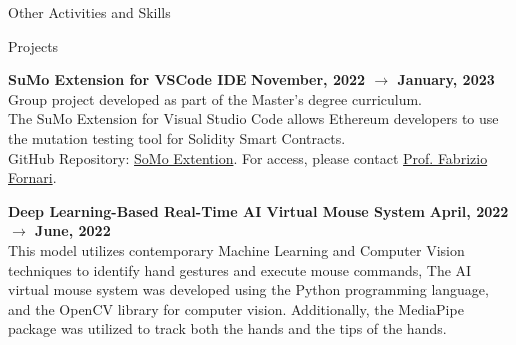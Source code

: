 \documentclass{resume} %
\begin{document}

    \begin{rSection}{Other Activities and Skills}


        \begin{rSubsection2}{ Projects }

            \item\textbf{ SuMo Extension for VSCode IDE }\hfill \textbf{November, 2022 $\rightarrow$ January, 2023}
            \\Group project developed as part of the Master's degree curriculum.
            \\The SuMo Extension for Visual Studio Code allows Ethereum developers to use the mutation testing tool for Solidity Smart Contracts.
            \\GitHub Repository: \href{https://github.com/FabrizioFornari/SPM-2022-AAR}{SoMo Extention}. For access, please contact \href{https://github.com/FabrizioFornari}{Prof. Fabrizio Fornari}.

            \item\textbf{ Deep Learning-Based Real-Time AI Virtual Mouse System }\hfill \textbf{April, 2022 $\rightarrow$ June, 2022}
            \\This model utilizes contemporary Machine Learning and Computer Vision techniques to identify hand gestures and execute mouse commands,
            The AI virtual mouse system was developed using the Python programming language, and the OpenCV library for computer vision.
            Additionally, the MediaPipe package was utilized to track both the hands and the tips of the hands.

        \end{rSubsection2}


\end{rSection}
\end{document}
